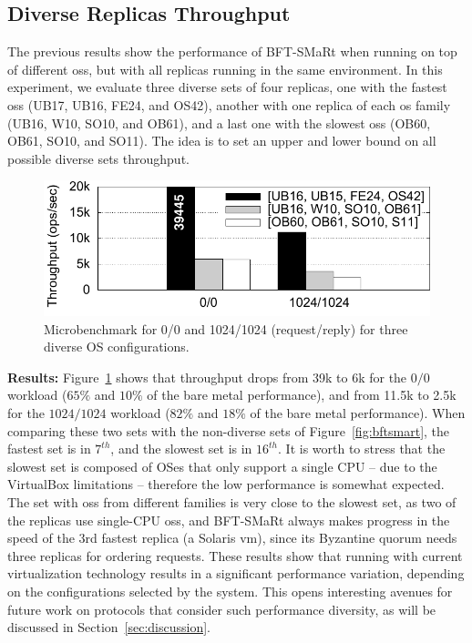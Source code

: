 \subsection{Diverse Replicas Throughput}
\label{sec:performancediversity}

The previous results show the performance of BFT-SMaRt when running on top of different \glspl{os}, but with all replicas running in the same environment.
In this experiment, we evaluate three diverse sets of four replicas, one with the fastest \glspl{os} (UB17, UB16, FE24, and OS42), another with one replica of each \gls{os} family (UB16, W10, SO10, and OB61), and a last one with the slowest \glspl{os} (OB60, OB61, SO10, and SO11).
The idea is to set an upper and lower bound on all possible diverse sets throughput.

\begin{figure}[h]
\begin{center}
\includegraphics[width=\columnwidth]{images/gnuplot/vagrant/runs_diversity/throughput.pdf}
\caption{Microbenchmark for 0/0 and 1024/1024 (request/reply) for three diverse OS configurations.}
\label{fig:diversets}
\end{center}
\end{figure}


\textbf{Results:}
Figure~\ref{fig:diversets} shows that throughput drops from 39k to 6k for the $0/0$ workload ($65\%$ and $10\%$ of the bare metal performance), and from 11.5k to 2.5k for the $1024/1024$ workload ($82\%$ and $18\%$ of the bare metal performance).
When comparing these two sets with the non-diverse sets of Figure~\ref{fig:bftsmart}, the fastest set is in $7^{th}$, and the slowest set is in $16^{th}$.
It is worth to stress that the slowest set is composed of OSes that only support a single CPU -- due to the VirtualBox limitations -- therefore the low performance is somewhat expected.
The set with \glspl{os} from different families is very close to the slowest set, as two of the replicas use single-CPU \glspl{os}, and BFT-SMaRt always makes progress in the speed of the 3rd fastest replica (a Solaris \gls{vm}), since its Byzantine quorum needs three replicas for ordering requests.
These results show that running \system with current virtualization technology results in a significant performance variation, depending on the configurations selected by the system.
This opens interesting avenues for future work on protocols that consider such performance diversity, as will be discussed in Section~\ref{sec:discussion}.

